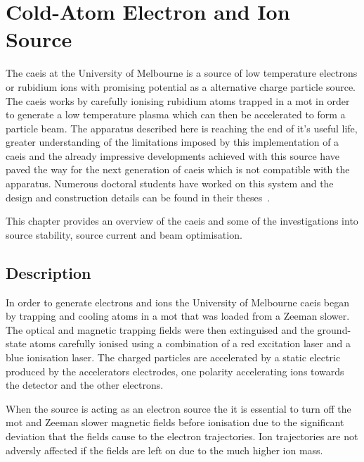 \chapter{Cold-Atom Electron and Ion Source}\label{chapter:setup}

The \gls{caeis} at the University of Melbourne is a source of low temperature electrons or rubidium ions with promising potential as a alternative charge particle source.
The \gls{caeis} works by carefully ionising rubidium atoms trapped in a \gls{mot} in order to generate a low temperature plasma which can then be accelerated to form a particle beam.
The apparatus described here is reaching the end of it's useful life, greater understanding of the limitations imposed by this implementation of a \gls{caeis} and the already impressive developments achieved with this source have paved the way for the next generation of \gls{caeis} which is not compatible with the apparatus.
Numerous doctoral students have worked on this system and the design and construction details can be found in their theses~\cite{sheludko_shaped_2010,bell_cold_2011,saliba_cold_2011,mcculloch_generation_2013,murphy_measurement_2017,rory_thesis}.

This chapter provides an overview of the \gls{caeis} and some of the investigations into source stability, source current and beam optimisation.

\section{Description}
In order to generate electrons and ions the University of Melbourne \gls{caeis} began by trapping and cooling atoms in a \gls{mot} that was loaded from a Zeeman slower.
The optical and magnetic trapping fields were then extinguised and the ground-state atoms carefully ionised using a combination of a red excitation laser and a blue ionisation laser.
The charged particles are accelerated by a static electric produced by the accelerators electrodes, one polarity accelerating ions towards the detector and the other electrons.

When the source is acting as an electron source the it is essential to turn off the \gls{mot} and Zeeman slower magnetic fields before ionisation due to the significant deviation that the fields cause to the electron trajectories.
Ion trajectories are not adversly affected if the fields are left on due to the much higher ion mass.

